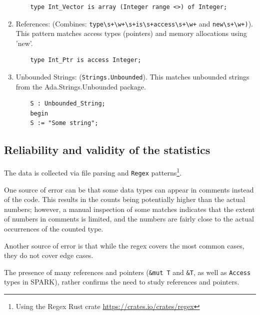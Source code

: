 \documentclass[nomenclature, english, bibtex]{kththesis}
\newcommand{\inlinecode}[1]{\texttt{#1}}
\begin{document}
\begin{enumerate}
    \begin{verbatim}
    type Int_Vector is array (Integer range <>) of Integer;
    \end{verbatim}

    \item References: (Combines: \verb|type\s+\w+\s+is\s+access\s+\w+| and \verb|new\s+\w+)|). This pattern matches access types (pointers) and memory allocations using 'new'.

    \begin{verbatim}
    type Int_Ptr is access Integer;
    \end{verbatim}

    \item Unbounded Strings: (\verb|Strings.Unbounded|). This matches unbounded strings from the Ada.Strings.Unbounded package.

    \begin{verbatim}
    S : Unbounded_String;
    begin
    S := "Some string";
    \end{verbatim}
\end{enumerate}

 

\subsection{Reliability and validity of the statistics}

The data is collected via file parsing and \texttt{Regex} patterns\footnote{Using the Regex Rust crate \href{(documentation)}{https://crates.io/crates/regex}}. 

One source of error can be that some data types can appear in comments instead of the code. This results in the counts being potentially higher than the actual numbers; however, a manual inspection of some matches indicates that the extent of numbers in comments is limited, and the numbers are fairly close to the actual occurrences of the counted type.


Another source of error is that while the regex covers the most common cases, they do not cover edge cases.

The presence of many references and pointers (\inlinecode{\&mut T} and \inlinecode{\&T}, as well as \inlinecode{Access} types in SPARK), rather confirms the need to study references and pointers.
\end{document}
